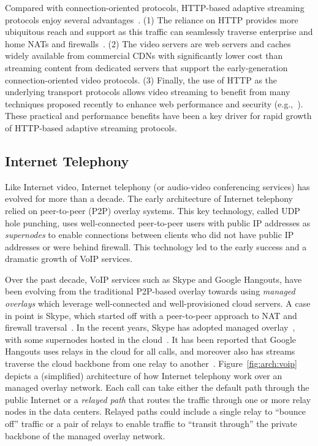 Compared with connection-oriented protocols, HTTP-based adaptive streaming 
protocols enjoy several advantages~\cite{festive}.
(1) The reliance on HTTP provides more ubiquitous reach and support 
as this traffic can seamlessly traverse enterprise and home
NATs and firewalls~\cite{httpwaist}.
(2)  The video servers are web servers and caches widely available from commercial
CDNs with significantly lower cost than streaming content from dedicated 
servers that support the early-generation connection-oriented video protocols.
(3) Finally, the use of HTTP as the underlying transport protocols allows 
video streaming to benefit from many techniques proposed recently to enhance
web performance and security (e.g.,~\cite{wang2014speedy}).
These practical and performance benefits have been a key driver for rapid 
growth of HTTP-based adaptive streaming protocols.



\subsection{Internet Telephony}
\label{subsec:related:back:voip}

Like Internet video, Internet telephony (or audio-video conferencing services) 
has evolved for more than a decade.
The early architecture of Internet telephony relied on peer-to-peer (P2P)
overlay systems. This key technology, called UDP hole punching, uses 
well-connected peer-to-peer users with public IP addresses 
as {\em supernodes} to enable connections between clients 
who did not have public IP addresses or were behind firewall. 
This technology led to the early success and a dramatic growth of VoIP 
services.

Over the past decade, VoIP services such as Skype and Google Hangouts, 
have been evolving from the traditional P2P-based overlay towards 
using {\em managed overlays} which leverage well-connected and well-provisioned 
cloud servers. 
A case in point is Skype, which started off with a peer-to-peer approach to NAT 
and firewall traversal~\cite{Skype-GI08}. 
In the recent years, Skype has adopted managed 
overlay~\cite{VideoTelephony-IMC12}, with some supernodes hosted in the 
cloud~\cite{Skype-Zdnet13}. 
It has been reported that Google Hangouts uses relays in the cloud for all 
calls, and moreover also has streams traverse the cloud backbone from one 
relay to another~\cite{VideoTelephony-IMC12}. 
Figure~\ref{fig:arch:voip} depicts a (simplified) architecture of how 
Internet telephony work over an managed overlay network.
Each call can take either the default path through the public Internet or
a {\em relayed path} that routes the traffic through
one or more relay nodes in the data centers. Relayed paths could include
a single relay to ``bounce off'' traffic or a pair of relays
to enable traffic to ``transit through'' the private backbone of
the managed overlay network.

